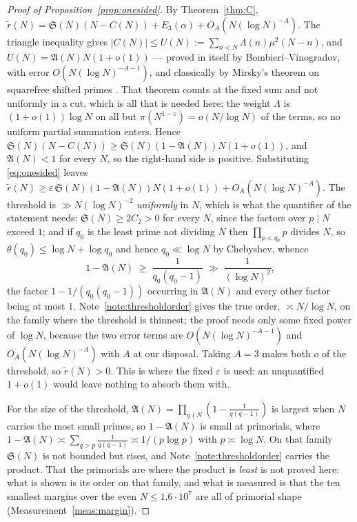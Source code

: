 \documentclass[11pt,a4paper]{article}
\theoremstyle{plain}
\theoremstyle{definition}
\theoremstyle{remark}
\renewcommand{\SS}{\mathfrak{S}}
\newcommand{\AAA}{\mathfrak{A}}
\begin{document}
\begin{proof}[Proof of Proposition~\ref{prop:onesided}]
By Theorem~\ref{thm:C},
$\tilde r(N)=\SS(N)(N-C(N))+E_3(\alpha)+O_A(N(\log N)^{-A})$. The
triangle inequality gives
$|C(N)|\le U(N):=\sum_{n<N}\Lambda(n)\mu^2(N-n)$, and
$U(N)=\AAA(N)N(1+o(1))$ --- proved in \cite[\S3.3]{HL} itself by
Bombieri--Vinogradov, with error $O(N(\log N)^{-A-1})$, and classically
by Mirsky's theorem on squarefree shifted primes \cite{Mir49}. That
theorem counts at the fixed sum and not uniformly in a cut, which is
all that is needed here: the weight $\Lambda$ is
$(1+o(1))\log N$ on all but $\pi(N^{1-\varepsilon})=o(N/\log N)$ of
the terms, so no uniform partial summation enters. Hence
$\SS(N)(N-C(N))\ge\SS(N)(1-\AAA(N))N(1+o(1))$, and $\AAA(N)<1$ for
every $N$, so the right-hand side is positive. Substituting
\eqref{eq:onesided} leaves $\tilde r(N)\ge\varepsilon\,\SS(N)
(1-\AAA(N))N(1+o(1))+O_A(N(\log N)^{-A})$. The threshold is
$\gg N(\log N)^{-2}$ \emph{uniformly} in $N$, which is what the
quantifier of the statement needs: $\SS(N)\ge2C_2>0$ for every $N$,
since the factors over $p\mid N$ exceed $1$; and if $q_0$ is the least
prime not dividing $N$ then $\prod_{p<q_0}p$ divides $N$, so
$\theta(q_0)\le\log N+\log q_0$ and hence $q_0\ll\log N$ by Chebyshev,
whence
\[
  1-\AAA(N)\;\ge\;\frac{1}{q_0(q_0-1)}\;\gg\;\frac{1}{(\log N)^{2}} ,
\]
the factor $1-1/(q_0(q_0-1))$ occurring in $\AAA(N)$ and every other
factor being at most $1$. Note~\ref{note:thresholdorder} gives the
true order, $\asymp N/\log N$, on the family where the
threshold is thinnest; the proof needs only some fixed power of
$\log N$, because the two error terms are $O(N(\log N)^{-A-1})$ and
$O_A(N(\log N)^{-A})$ with $A$ at our disposal. Taking $A=3$ makes
both $o$ of the threshold, so $\tilde r(N)>0$. This is where the fixed $\varepsilon$ is used: an
unquantified $1+o(1)$ would leave nothing to absorb them with.

For the size of the threshold, $\AAA(N)=\prod_{q\nmid N}
(1-\tfrac1{q(q-1)})$ is largest when $N$ carries the most small
primes, so $1-\AAA(N)$ is small at primorials, where
$1-\AAA(N)\asymp\sum_{q>p}\tfrac1{q(q-1)}\asymp1/(p\log p)$ with
$p\asymp\log N$. On that family $\SS(N)$ is not bounded but rises,
and Note~\ref{note:thresholdorder} carries the product. That the
primorials are where the product is \emph{least} is not proved here:
what is shown is its order on that family, and what is measured is
that the ten smallest margins over the even $N\le1.6\cdot10^7$ are all
of primorial shape (Measurement~\ref{meas:margin}).
\end{proof}
\end{document}
